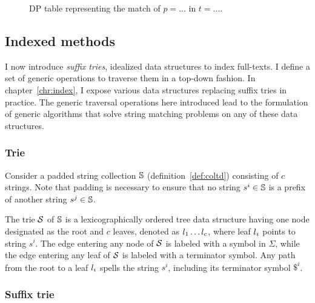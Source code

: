 \begin{figure}[h]
\begin{center}
\caption[Example of approximate string matching via DP]{DP table representing the match of $p=...$ in $t=...$.}
\label{fig:asm-dp}

\end{center}
\end{figure}


\subsection{Indexed methods}
\label{sub:introindex}

I now introduce \emph{suffix tries}, idealized data structures to index full-texts.
I define a set of generic operations to traverse them in a top-down fashion.
In chapter~\ref{chr:index}, I expose various data structures replacing suffix tries in practice.
The generic traversal operations here introduced lead to the formulation of generic algorithms that solve string matching problems on any of these data structures.

\subsubsection{Trie}

Consider a padded string collection $\mathbb {S}$ (definition~\ref{def:coltd}) consisting of $c$ strings.
Note that padding is necessary to ensure that no string $s^i \in \mathbb {S}$ is a prefix of another string $s^j \in \mathbb {S}$.
\begin{definition}
The trie $\mathcal {S}$ of $\mathbb {S}$ is a lexicographically ordered tree data structure having one node designated as the root and $c$ leaves, denoted as $l_1 \dots l_c$, where leaf $l_i$ points to string $s^i$.
The edge entering any node of $\mathcal {S}$ is labeled with a symbol in $\Sigma$, while the edge entering any leaf of $\mathcal {S}$ is labeled with a terminator symbol.
Any path from the root to a leaf $l_i$ spells the string $s^i$, including its terminator symbol $\$^i$.
\end{definition}

\subsubsection{Suffix trie}

